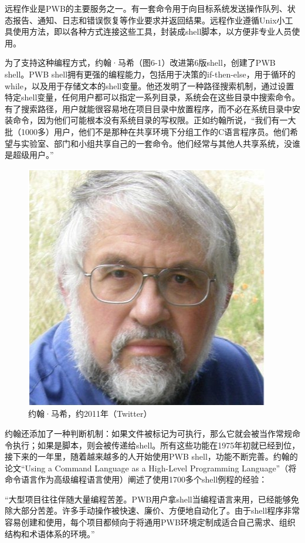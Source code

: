 \documentclass[a4paper,12pt,UTF8,twoside]{ctexbook}
\begin{document}
远程作业是PWB的主要服务之一。有一套命令用于向目标系统发送操作队列、状态报告、通知、日志和错误恢复等作业要求并返回结果。远程作业遵循Unix小工具使用方法，即以各种方式连接这些工具，封装成shell脚本，以方便非专业人员使用。

为了支持这种编程方式，约翰·马希（图6-1）改进第6版shell，创建了PWB shell。PWB shell拥有更强的编程能力，包括用于决策的if-then-else，用于循环的while，以及用于存储文本的shell变量。他还发明了一种路径搜索机制，通过设置特定shell变量，任何用户都可以指定一系列目录，系统会在这些目录中搜索命令。有了搜索路径，用户就能很容易地在项目目录中放置程序，而不必在系统目录中安装命令，因为他们可能根本没有系统目录的写权限。正如约翰所说，“我们有一大批（1000多）用户，他们不是那种在共享环境下分组工作的C语言程序员。他们希望与实验室、部门和小组共享自己的一套命令。他们经常与其他人共享系统，没谁是超级用户。”

\begin{figure}[htbp]
	\centering
	\includegraphics[width=0.7\linewidth]{59}
	\caption{约翰·马希，约2011年（Twitter）}
	\label{fig:1}
\end{figure}

约翰还添加了一种判断机制：如果文件被标记为可执行，那么它就会被当作常规命令执行；如果是脚本，则会被传递给shell。所有这些功能在1975年初就已经到位，接下来的一年里，随着越来越多的人开始使用PWB shell，功能不断完善。约翰的论文“Using a Command Language as a High-Level Programming Language”（将命令语言作为高级编程语言使用）阐述了使用1700多个shell例程的经验：

“大型项目往往伴随大量编程苦差。PWB用户拿shell当编程语言来用，已经能够免除大部分苦差。许多手动操作被快速、廉价、方便地自动化了。由于shell程序非常容易创建和使用，每个项目都倾向于将通用PWB环境定制成适合自己需求、组织结构和术语体系的环境。”
\end{document}
